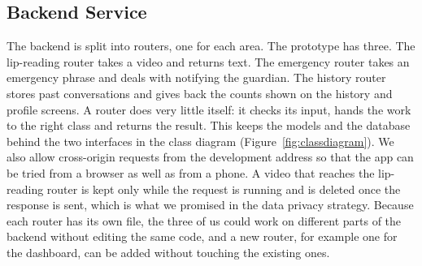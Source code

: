 \documentclass{FastFyp}
\begin{document}
\subsection{Backend Service}
The backend is split into routers, one for each area. The prototype has three. The lip-reading router takes a video and returns text. The emergency router takes an emergency phrase and deals with notifying the guardian. The history router stores past conversations and gives back the counts shown on the history and profile screens. A router does very little itself: it checks its input, hands the work to the right class and returns the result. This keeps the models and the database behind the two interfaces in the class diagram (Figure~\ref{fig:classdiagram}). We also allow cross-origin requests from the development address so that the app can be tried from a browser as well as from a phone. A video that reaches the lip-reading router is kept only while the request is running and is deleted once the response is sent, which is what we promised in the data privacy strategy. Because each router has its own file, the three of us could work on different parts of the backend without editing the same code, and a new router, for example one for the dashboard, can be added without touching the existing ones.
\end{document}
